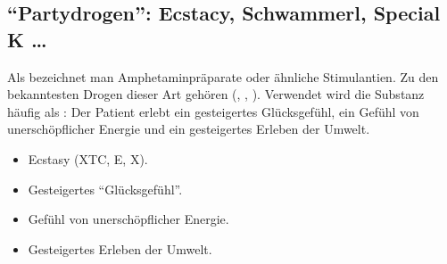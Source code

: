 % 

\subsection{\enquote{Partydrogen}: Ecstacy, Schwammerl,
Special K \ldots}

{Als  bezeichnet man Amphetaminpräparate oder
ähnliche Stimulantien. Zu den bekanntesten Drogen dieser Art
gehören   (, , ). Verwendet wird
die Substanz häufig als : Der Patient erlebt
ein gesteigertes Glücksgefühl, ein Gefühl von
unerschöpflicher Energie und ein gesteigertes Erleben der
Umwelt.

}{
\begin{itemize}
  \item Ecstasy (XTC, E, X).
  \item Gesteigertes \enquote{Glücksgefühl}.
  \item Gefühl von unerschöpflicher Energie.
  \item Gesteigertes Erleben der Umwelt.
\end{itemize}
}{}{}{}

